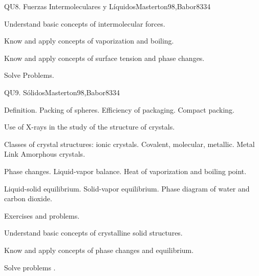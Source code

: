 \begin{syllabus}
\begin{unit}{}{QU8. Fuerzas Intermoleculares y Líquidos}{Masterton98,Babor83}{3}{4}
   \begin{learningoutcomes}
      \item Understand basic concepts of intermolecular forces.
      \item Know and apply concepts of vaporization and boiling.
      \item Know and apply concepts of surface tension and phase changes.
      \item Solve Problems.
   \end{learningoutcomes}
\end{unit}

\begin{unit}{}{QU9. Sólidos}{Masterton98,Babor83}{3}{4}
\begin{topics}

      \item Definition. Packing of spheres. Efficiency of packaging. Compact packing.
      \item Use of X-rays in the study of the structure of crystals.
      \item Classes of crystal structures: ionic crystals. Covalent, molecular, metallic. Metal Link Amorphous crystals.
      \item Phase changes. Liquid-vapor balance. Heat of vaporization and boiling point.
      \item Liquid-solid equilibrium. Solid-vapor equilibrium. Phase diagram of water and carbon dioxide.
      \item Exercises and problems.
    \end{topics}

   \begin{learningoutcomes}
      \item Understand basic concepts of crystalline solid structures.
      \item Know and apply concepts of phase changes and equilibrium.
      \item Solve problems .
   \end{learningoutcomes}
\end{unit}


\end{syllabus}
